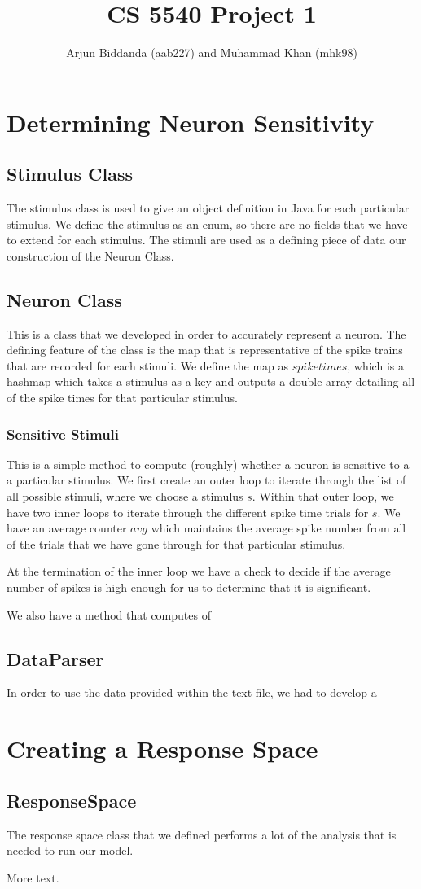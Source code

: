 \documentclass[11pt]{article} %
\title{CS 5540 Project 1}
\author{Arjun Biddanda (aab227) and Muhammad Khan (mhk98)}
\begin{document}
\maketitle

\section{Determining Neuron Sensitivity}
\subsection{Stimulus Class}
The stimulus class is used to give an object definition in Java for each particular stimulus. We define the stimulus as an enum, so there are no fields that we have to extend for each stimulus. The stimuli are used as a defining piece of data our construction of the Neuron Class.

\subsection{Neuron Class}
This is a class that we developed in order to accurately represent a neuron. The defining feature of the class is the map that is representative of the spike trains that are recorded for each stimuli. We define the map as $spiketimes$, which is a hashmap which takes a stimulus as a key and outputs a double array detailing all of the spike times for that particular stimulus. 
\subsubsection{Sensitive Stimuli}
This is a simple method to compute (roughly) whether a neuron is sensitive to a a particular stimulus. We first create an outer loop to iterate through the list of all possible stimuli, where we choose a stimulus $s$. Within that outer loop, we have two inner loops to iterate through the different spike time trials for $s$. We have an average counter $avg$ which maintains the average spike number from all of the trials that we have gone through for that particular stimulus. 

At the termination of the inner loop we have a check to decide if the average number of spikes is high enough for us to determine that it is significant. 

We also have a method that computes of 



\subsection{DataParser}
In order to use the data provided within the text file, we had to develop a  





\section{Creating a Response Space}
\subsection{ResponseSpace}
The response space class that we defined performs a lot of the analysis that is needed to run our model. 


More text.
\end{document}
